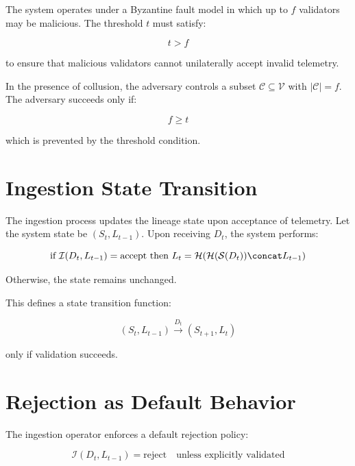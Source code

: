 The system operates under a Byzantine fault model in which up to $f$ validators may be malicious. The threshold $t$ must satisfy:

\begin{equation}
t > f
\end{equation}

to ensure that malicious validators cannot unilaterally accept invalid telemetry.

In the presence of collusion, the adversary controls a subset $\mathcal{C} \subseteq \mathcal{V}$ with $|\mathcal{C}| = f$. The adversary succeeds only if:

\begin{equation}
f \geq t
\end{equation}

which is prevented by the threshold condition.

\section{Ingestion State Transition}

The ingestion process updates the lineage state upon acceptance of telemetry. Let the system state be $(S_t, L_{t-1})$. Upon receiving $D_t$, the system performs:

\begin{equation}
\text{if } \mathcal{I}(D_t, L_{t-1}) = \text{accept} \text{ then } L_t = \mathcal{H}(\mathcal{H}(\mathcal{S}(D_t)) \concat L_{t-1})
\end{equation}

Otherwise, the state remains unchanged.

This defines a state transition function:

\begin{equation}
(S_t, L_{t-1}) \xrightarrow{D_t} (S_{t+1}, L_t)
\end{equation}

only if validation succeeds.

\section{Rejection as Default Behavior}

The ingestion operator enforces a default rejection policy:

\begin{equation}
\mathcal{I}(D_t, L_{t-1}) = \text{reject} \quad \text{unless explicitly validated}
\end{equation}

